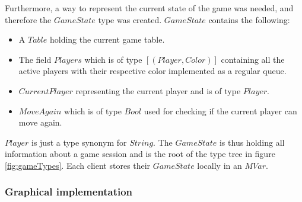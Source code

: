 \documentclass[a4paper]{article}
\begin{document}
Furthermore, a way to represent the current state of the game was needed, and therefore the $GameState$ type was created. $GameState$ contains the following: 
\begin{itemize}
    \item A $Table$ holding the current game table.
    \item The field $Players$ which is of type $[(Player,Color)]$ containing all the active players with their respective color implemented as a regular queue.
    \item $CurrentPlayer$ representing the current player and is of type $Player$.
    \item $MoveAgain$ which is of type $Bool$ used for checking if the current player can move again.
    
\end{itemize}
$Player$ is just a type synonym for $String$. The $GameState$ is thus holding all information about a game session and is the root of the type tree in figure \ref{fig:gameTypes}. Each client stores their $GameState$ locally in an $MVar$.


\subsubsection{Graphical implementation}
\label{sec:graphimpl}
\end{document}
